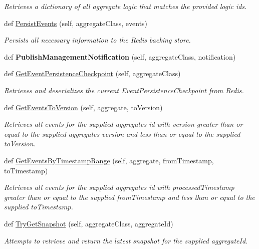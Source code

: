\begin{DoxyCompactItemize}
\begin{DoxyCompactList}\small\item\em Retrieves a dictionary of all aggregate logic that matches the provided logic ids. \end{DoxyCompactList}\item 
def \hyperlink{group__Chronos_gaa6e3ef31e155461d4739f78f557289dc}{Persist\+Events} (self, aggregate\+Class, events)
\begin{DoxyCompactList}\small\item\em Persists all necessary information to the Redis backing store. \end{DoxyCompactList}\item 
def {\bfseries Publish\+Management\+Notification} (self, aggregate\+Class, notification)
\item 
def \hyperlink{group__Chronos_gac49283b5aa4ff3905743e32a22a4d603}{Get\+Event\+Persistence\+Checkpoint} (self, aggregate\+Class)
\begin{DoxyCompactList}\small\item\em Retrieves and deserializes the current Event\+Persistence\+Checkpoint from Redis. \end{DoxyCompactList}\item 
def \hyperlink{group__Chronos_ga800945f4d3c67903a35524bebd8041e6}{Get\+Events\+To\+Version} (self, aggregate, to\+Version)
\begin{DoxyCompactList}\small\item\em Retrieves all events for the supplied aggregate\textquotesingle{}s id with version greater than or equal to the supplied aggregate\textquotesingle{}s version and less than or equal to the supplied to\+Version. \end{DoxyCompactList}\item 
def \hyperlink{group__Chronos_gac6fb1dcb8045a9c9aeb5716f78dbff89}{Get\+Events\+By\+Timestamp\+Range} (self, aggregate, from\+Timestamp, to\+Timestamp)
\begin{DoxyCompactList}\small\item\em Retrieves all events for the supplied aggregate\textquotesingle{}s id with processed\+Timestamp greater than or equal to the supplied from\+Timestamp and less than or equal to the supplied to\+Timestamp. \end{DoxyCompactList}\item 
def \hyperlink{group__Chronos_ga36ff3627316ace7a057bbbc2afab72c6}{Try\+Get\+Snapshot} (self, aggregate\+Class, aggregate\+Id)
\begin{DoxyCompactList}\small\item\em Attempts to retrieve and return the latest snapshot for the supplied aggregate\+Id. \end{DoxyCompactList}\item 

\end{DoxyCompactItemize}
